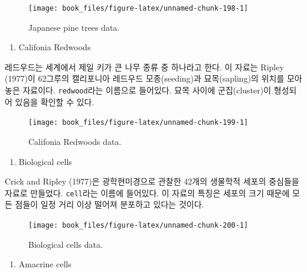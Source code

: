 \documentclass[b5paper,]{book}
\providecommand{\tightlist}{%
  \setlength{\itemsep}{0pt}\setlength{\parskip}{0pt}}
\theoremstyle{definition}
\theoremstyle{definition}
\theoremstyle{definition}
\theoremstyle{remark}
\begin{document}
\begin{figure}

{\centering \texttt{[image: book\_files/figure-latex/unnamed-chunk-198-1]} 

}

\caption{Japanese pine trees data.}\label{fig:unnamed-chunk-198}
\end{figure}

\begin{enumerate}
\def\labelenumi{\arabic{enumi}.}
\setcounter{enumi}{1}
\tightlist
\item
  Califonia Redwoods
\end{enumerate}

레드우드는 세계에서 제일 키가 큰 나무 종류 중 하나라고 한다. 이 자료는
Ripley (1977)이 62그루의 캘리포니아 레드우드 모종(seeding)과
묘목(sapling)의 위치를 모아놓은 자료이다. \texttt{redwood}라는 이름으로
들어있다. 묘목 사이에 군집(cluster)이 형성되어 있음을 확인할 수 있다.

\begin{figure}

{\centering \texttt{[image: book\_files/figure-latex/unnamed-chunk-199-1]} 

}

\caption{Califonia Redwoods data.}\label{fig:unnamed-chunk-199}
\end{figure}

\begin{enumerate}
\def\labelenumi{\arabic{enumi}.}
\setcounter{enumi}{2}
\tightlist
\item
  Biological cells
\end{enumerate}

Crick and Ripley (1977)은 광학현미경으로 관찰한 42개의 생물학적 세포의
중심들을 자료로 만들었다. \texttt{cell}라는 이름에 들어있다. 이 자료의
특징은 세포의 크기 때문에 모든 점들이 일정 거리 이상 떨어져 분포하고
있다는 것이다.

\begin{figure}

{\centering \texttt{[image: book\_files/figure-latex/unnamed-chunk-200-1]} 

}

\caption{Biological cells data.}\label{fig:unnamed-chunk-200}
\end{figure}

\begin{enumerate}
\def\labelenumi{\arabic{enumi}.}
\setcounter{enumi}{3}
\tightlist
\item
  Amacrine cells
\end{enumerate}
\end{document}
